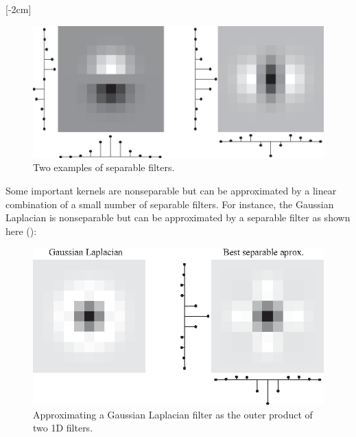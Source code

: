 [-2cm]

\begin{figure}[h]
    \centerline{
        \includegraphics[width=.6\linewidth]{./figures/convolutional_neural_nets/kernels_separable_aprox.eps}}
    \caption{Two examples of separable filters.}
    \label{fig:convolutional_neural_nets:kernels_separable_aprox}
\end{figure}
\vspace{-0.4cm}

Some important kernels are nonseparable but can be approximated by a linear combination of a small number of separable filters. For instance, the Gaussian Laplacian is nonseparable but can be approximated by a separable filter as shown here (\fig{\ref{fig:convolutional_neural_nets:laplacian_separable_aprox}}):
\begin{figure}[h]
    \centerline{
        \includegraphics[width=.6\linewidth]{./figures/convolutional_neural_nets/laplacian_separable_aprox.eps}}
    \caption{Approximating a Gaussian Laplacian filter as the outer product of two 1D filters.}
    \label{fig:convolutional_neural_nets:laplacian_separable_aprox}
\end{figure}
\vspace{-0.4cm}

